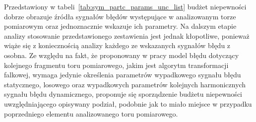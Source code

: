 Przedstawiony w tabeli~\ref{tab:sym_partc_params_unc_list} budżet niepewności dobrze obrazuje źródła sygnałów błędów występujące w analizowanym torze pomiarowym oraz jednoznacznie wskazuje ich parametry. Na dalszym etapie analizy stosowanie przedstawionego zestawienia jest jednak kłopotliwe, ponieważ wiąże się z koniecznością analizy każdego ze wskazanych sygnałów błędu z osobna. Ze względu na fakt, że proponowany w pracy model błędu dotyczący kolejnego fragmentu toru pomiarowego, jakim jest algorytm transformacji falkowej, wymaga jedynie określenia parametrów wypadkowego sygnału błędu statycznego, losowego oraz wypadkowych parametrów kolejnych harmonicznych sygnału błędu dynamicznego, proponuje się sporządzenie budżetu niepewności uwzględniającego opisywany podział, podobnie jak to miało miejsce w przypadku poprzedniego elementu analizowanego toru pomiarowego.

